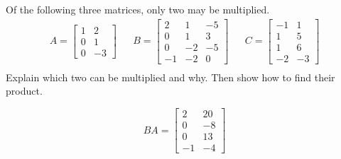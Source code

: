 
\begin{exerciseStatement}


Of the following three matrices, only two may be multiplied. 
\begin{align*} A= \left[\begin{array}{cc}
1 & 2 \\
0 & 1 \\
0 & -3
\end{array}\right]  & & B= \left[\begin{array}{ccc}
2 & 1 & -5 \\
0 & 1 & 3 \\
0 & -2 & -5 \\
-1 & -2 & 0
\end{array}\right]  & & C= \left[\begin{array}{cc}
-1 & 1 \\
1 & 5 \\
1 & 6 \\
-2 & -3
\end{array}\right]  \\ \end{align*}
             Explain which two can be multiplied and why. Then show how to find their product.


\end{exerciseStatement}
    
\begin{exerciseAnswer} 
\[BA= \left[\begin{array}{cc}
2 & 20 \\
0 & -8 \\
0 & 13 \\
-1 & -4
\end{array}\right] \]
\end{exerciseAnswer}
    
